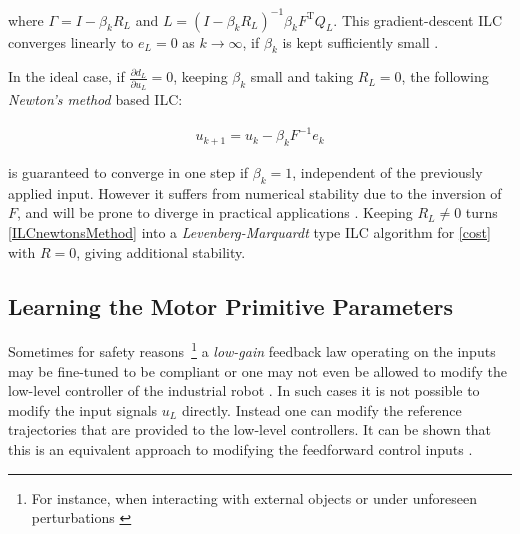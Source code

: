 \documentclass[10pt,a4paper]{article}
\newcommand{\todo}{\textcolor{red}{TODO}} %
\newcommand{\error}{e} %
\newcommand{\linDist}{d} %
\newcommand{\sysInput}{u} %
\newcommand{\qmatrix}{\Gamma} %
\newcommand{\lmatrix}{L} %
\begin{document}
where $\qmatrix = I - \beta_kR_L$ and $\lmatrix = (I - \beta_kR_L)^{-1}\beta_kF^\mathrm{T}Q_L$. This gradient-descent ILC converges linearly to $\error_L = 0$ as $k \to \infty$, if $\beta_k$ is kept sufficiently small \cite{Nocedal99}.

In the ideal case, if $\frac{\partial{\linDist_L}}{\partial{\sysInput_L}} = 0$, keeping $\beta_k$ small and taking $R_L = 0$, the following \emph{Newton's method} based ILC:


\begin{equation}
\begin{aligned}
\sysInput_{k+1} = \sysInput_k - \beta_kF^\mathrm{-1}\error_k
\end{aligned}
\label{ILCnewtonsMethod}
\end{equation}

is guaranteed to converge in one step if $\beta_k = 1$, independent of the previously applied input. However it suffers from numerical stability due to the inversion of $F$, and will be prone to diverge in practical applications \cite{Bristow06}. Keeping $R_L \neq 0$ turns \eqref{ILCnewtonsMethod} into a \emph{Levenberg-Marquardt} type ILC algorithm for \eqref{cost} with $R = 0$, giving additional stability. 


\subsection{Learning the Motor Primitive Parameters}

Sometimes for safety reasons~\footnote{For instance, when interacting with external objects or under unforeseen perturbations \cite{Schaal07}} a \emph{low-gain} feedback law operating on the inputs may be fine-tuned to be compliant or one may not even be allowed to modify the low-level controller of the industrial robot \cite{Longman2000}. In such cases it is not possible to modify the input signals $\sysInput_L$ directly. Instead one can modify the reference trajectories that are provided to the low-level controllers. It can be shown that this is an equivalent approach to modifying the feedforward control inputs \cite{Bristow06}.
\end{document}
